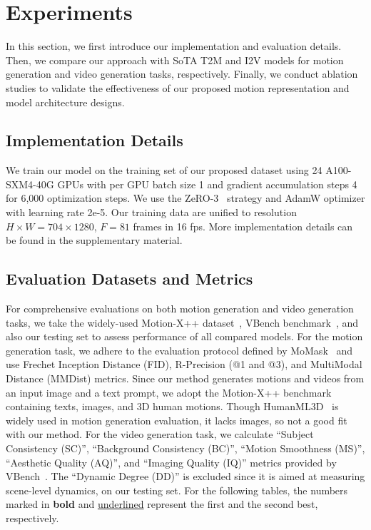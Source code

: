 \section{Experiments}
\label{sec:experiments}

In this section, we first introduce our implementation and evaluation details. Then, we compare our approach with SoTA T2M and I2V models for motion generation and video generation tasks, respectively. Finally, we conduct ablation studies to validate the effectiveness of our proposed motion representation and model architecture designs.

\subsection{Implementation Details}
\label{sec:imp_details}

We train our model on the training set of our proposed dataset using 24 A100-SXM4-40G GPUs with per GPU batch size 1 and gradient accumulation steps 4 for 6,000 optimization steps. We use the ZeRO-3~\cite{rajbhandari2020zero} strategy and AdamW optimizer with learning rate 2e-5. Our training data are unified to resolution $H\times W=704\times1280$, $F=81$ frames in 16 fps. More implementation details can be found in the supplementary material.

\subsection{Evaluation Datasets and Metrics}
\label{sec:eval_metrics}
For comprehensive evaluations on both motion generation and video generation tasks, we take the widely-used Motion-X++ dataset~\cite{lin2023motionx}, VBench benchmark~\cite{huang2023vbench,huang2024vbench++,zheng2025vbench2}, and also our testing set to assess performance of all compared models. For the motion generation task, we adhere to the evaluation protocol defined by MoMask~\cite{guo2024momask} and use Frechet Inception Distance (FID), R-Precision (@1 and @3), and MultiModal Distance (MMDist) metrics. Since our method generates motions and videos from an input image and a text prompt, we adopt the Motion-X++ benchmark~\cite{lin2023motionx} containing texts, images, and 3D human motions. Though HumanML3D~\cite{guo2022ml3d} is widely used in motion generation evaluation, it lacks images, so not a good fit with our method. For the video generation task, we calculate ``Subject Consistency (SC)'', ``Background Consistency (BC)'', ``Motion Smoothness (MS)'', ``Aesthetic Quality (AQ)'', and ``Imaging Quality (IQ)'' metrics provided by VBench~\cite{huang2023vbench,huang2024vbench++,zheng2025vbench2}. The ``Dynamic Degree (DD)'' is excluded since it is aimed at measuring scene-level dynamics, on our testing set. For the following tables, the numbers marked in \textbf{bold} and \underline{underlined} represent the first and the second best, respectively.

